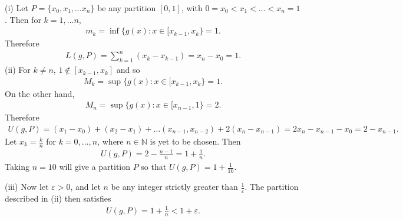 \documentclass[letterpaper,10pt,english]{jupyterBook}
\begin{document}
\sphinxAtStartPar
(i) Let \(P=\{x_0,x_1,\ldots x_n\}\) be any partition \([0,1]\), with \(0=x_0<x_1<\ldots<x_n=1\). Then for \(k=1,\ldots n\),
\begin{equation*}
\begin{split}
m_k=\inf\{g(x) : x\in[x_{k-1},x_k\} = 1.
\end{split}
\end{equation*}
\sphinxAtStartPar
Therefore
\begin{equation*}
\begin{split}
L(g,P) = \sum_{k=1}^n(x_k-x_{k-1}) = x_n-x_0 = 1.
\end{split}
\end{equation*}
\sphinxAtStartPar
(ii) For \(k\neq n\), \(1\notin[x_{k-1},x_k]\) and so
\begin{equation*}
\begin{split}
M_k=\sup\{g(x) : x\in[x_{k-1},x_k\} = 1.
\end{split}
\end{equation*}
\sphinxAtStartPar
On the other hand,
\begin{equation*}
\begin{split}
M_n=\sup\{g(x) : x\in[x_{n-1},1\} = 2.
\end{split}
\end{equation*}
\sphinxAtStartPar
Therefore
\begin{equation*}
\begin{split}
U(g,P) = (x_1-x_0) + (x_2-x_1) + \ldots (x_{n-1},x_{n-2}) + 2(x_n-x_{n-1}) = 2x_n-x_{n-1}-x_0 = 2-x_{n-1}.
\end{split}
\end{equation*}
\sphinxAtStartPar
Let \(x_k=\frac{k}{n}\) for \(k=0,\ldots,n\), where \(n\in\mathbb{N}\) is yet to be chosen. Then
\begin{equation*}
\begin{split}
U(g,P) = 2-\frac{n-1}{n} = 1+\frac{1}{n}.
\end{split}
\end{equation*}
\sphinxAtStartPar
Taking \(n=10\) will give a partition \(P\) so that \(U(g,P)=1+\frac{1}{10}\).

\sphinxAtStartPar
(iii) Now let \(\varepsilon>0\), and let \(n\) be any integer strictly greater than \(\frac{1}{\varepsilon}\). The partition described in (ii) then satisfies
\begin{equation*}
\begin{split}
U(g,P) = 1+\frac{1}{n} < 1+\varepsilon.
\end{split}
\end{equation*}
\end{document}
